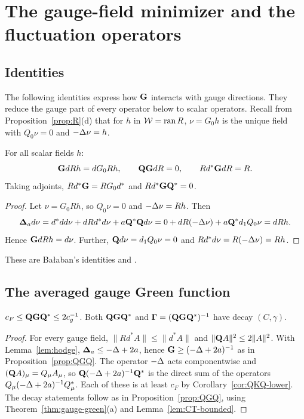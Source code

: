 \section{The gauge-field minimizer and the fluctuation operators}\label{sec:gauge-min}

\subsection{Identities}\label{ss:11.1}

The following identities express how $\mathbf G$ interacts with gauge directions. They reduce the gauge part of every operator below to scalar operators. Recall from Proposition~\ref{prop:R}(d) that for $h$ in $\mathcal W=\operatorname{ran} R$, $\nu=G_0h$ is the unique field with $Q_0\nu=0$ and $-\Delta\nu=h$.

\begin{proposition}\label{prop:gauge-identities}
For all scalar fields $h$:
\[
\mathbf G dRh=dG_0Rh,\qquad \mathbf Q\mathbf G dR=0,\qquad Rd^*\mathbf G dR=R .
\]
Taking adjoints, $Rd^*\mathbf G=RG_0d^*$ and $Rd^*\mathbf G\mathbf Q^*=0$.
\end{proposition}

\begin{proof}
Let $\nu=G_0Rh$, so $Q_0\nu=0$ and $-\Delta\nu=Rh$. Then
\[
\boldsymbol{\Delta}_a d\nu=d^*dd\nu+dRd^*d\nu+a\mathbf Q^*\mathbf Q d\nu=0+dR(-\Delta\nu)+a\mathbf Q^*d_1 Q_0\nu=dRh .
\]
Hence $\mathbf G dRh=d\nu$. Further, $\mathbf Q d\nu=d_1 Q_0\nu=0$ and $Rd^*d\nu=R(-\Delta\nu)=Rh$.
\end{proof}

These are Ba\l aban's identities \cite[(1.95), (1.97)]{BalPropI} and \cite[(3.152)]{BalBackground}.

\subsection{The averaged gauge Green function}\label{ss:11.2}

\begin{proposition}\label{prop:QGQ-gauge}
$c_F\le\mathbf Q\mathbf G\mathbf Q^*\le2c_g^{-1}$. Both $\mathbf Q\mathbf G\mathbf Q^*$ and $\boldsymbol\Gamma=(\mathbf Q\mathbf G\mathbf Q^*)^{-1}$ have decay $(C,\gamma)$.
\end{proposition}

\begin{proof}
For every gauge field, $\|Rd^*A\|\le\|d^*A\|$ and $\|\mathbf Q A\|^2\le2\|A\|^2$. With Lemma~\ref{lem:hodge}, $\boldsymbol{\Delta}_a\le-\Delta+2a$, hence $\mathbf G\ge(-\Delta+2a)^{-1}$ as in Proposition~\ref{prop:QGQ}. The operator $-\Delta$ acts componentwise and $(\mathbf Q A)_\mu=Q_\mu A_\mu$, so $\mathbf Q(-\Delta+2a)^{-1}\mathbf Q^*$ is the direct sum of the operators $Q_\mu(-\Delta+2a)^{-1}Q_\mu^*$. Each of these is at least $c_F$ by Corollary~\ref{cor:QKQ-lower}. The decay statements follow as in Proposition~\ref{prop:QGQ}, using Theorem~\ref{thm:gauge-green}(a) and Lemma~\ref{lem:CT-bounded}.
\end{proof}

